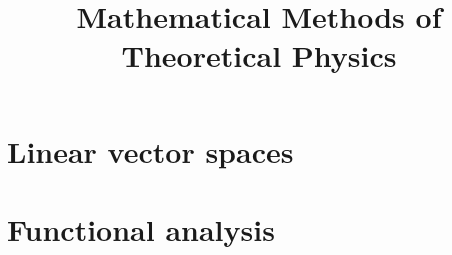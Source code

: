\documentclass{ws-book961x669}
\title{Mathematical Methods of Theoretical Physics}         %
\begin{document}
\titlepages                        %






\tableofcontents



\setcounter{page}{1}




\part{Linear vector spaces}{}




\part{Functional analysis}{}



\end{document}
